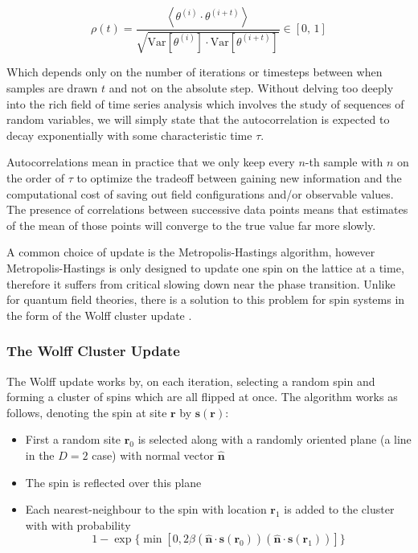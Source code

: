 \documentclass[12pt]{article}
\begin{document}
\begin{equation}
	\rho(t) = \frac{\left\langle \theta^{(i)}\cdot\theta^{(i+t)} \right\rangle}{\sqrt{\mathrm{Var}[\theta^{(i)}]\cdot\mathrm{Var}[\theta^{(i+t)}]}}
	\in [0,\,1]
\end{equation}

Which depends only on the number of iterations or timesteps between when samples are drawn $t$ and not on the absolute step. Without delving too deeply into
the rich field of time series analysis which involves the study of sequences of random variables, we will simply state that the autocorrelation
is expected to decay exponentially with some characteristic time $\tau$.

Autocorrelations mean in practice that we only keep every $n$-th sample with $n$ on the order of $\tau$ to optimize the tradeoff between gaining new information and the computational cost
of saving out field configurations and/or observable values. The presence of correlations between successive data points means that estimates of the mean of those points
will converge to the true value far more slowly.

A common choice of update is the Metropolis-Hastings algorithm, however Metropolis-Hastings is only designed to update one spin on the lattice at a time, therefore
it suffers from critical slowing down near the phase transition. Unlike for quantum field theories, there is a solution to this problem for spin systems in the form
of the Wolff cluster update \cite{PhysRevLett.62.361}.

\subsubsection{The Wolff Cluster Update}

The Wolff update works by, on each iteration, selecting a random spin and forming a cluster of spins which are all flipped at once. The algorithm works as follows,
denoting the spin at site $\mathbf{r}$ by $\mathbf{s}(\mathbf{r})$:

\begin{itemize}
	\item First a random site $\mathbf{r}_0$ is selected along with a randomly oriented plane (a line in the $D=2$ case) with normal vector $\mathbf{\hat{n}}$
	\item The spin is reflected over this plane
	\item Each nearest-neighbour to the spin with location $\mathbf{r}_1$ is added to the cluster with with probability \[
		      1-\exp\{\min[0,2\beta(\mathbf{\hat{n}} \cdot \mathbf{s}(\mathbf{r}_0))(\mathbf{\hat{n}} \cdot \mathbf{s}(\mathbf{r}_1))]\}
	      \]
\end{itemize}
\end{document}

